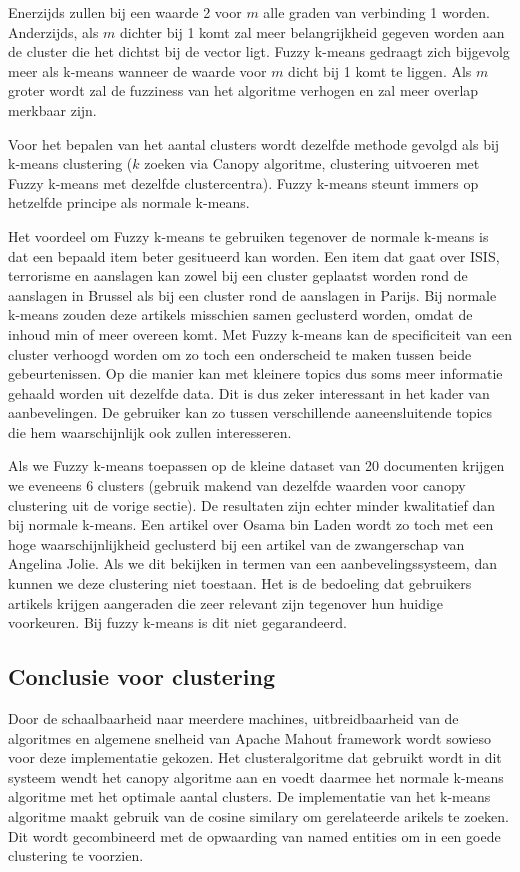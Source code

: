 Enerzijds zullen bij een waarde 2 voor $m$ alle graden van verbinding 1 worden. Anderzijds, als $m$ dichter bij 1 komt zal meer belangrijkheid gegeven worden aan de cluster die het dichtst bij de vector ligt. Fuzzy k-means gedraagt zich bijgevolg meer als k-means wanneer de waarde voor $m$ dicht bij 1 komt te liggen. Als $m$ groter wordt zal de fuzziness van het algoritme verhogen en zal meer overlap merkbaar zijn. 

Voor het bepalen van het aantal clusters wordt dezelfde methode gevolgd als bij k-means clustering ($k$ zoeken via Canopy algoritme, clustering uitvoeren met Fuzzy k-means met dezelfde clustercentra). Fuzzy k-means steunt immers op hetzelfde principe als normale k-means. 

Het voordeel om Fuzzy k-means te gebruiken tegenover de normale k-means is dat een bepaald item beter gesitueerd kan worden. Een item dat gaat over ISIS, terrorisme en aanslagen kan zowel bij een cluster geplaatst worden rond de aanslagen in Brussel als bij een cluster rond de aanslagen in Parijs. Bij normale k-means zouden deze artikels misschien samen geclusterd worden, omdat de inhoud min of meer overeen komt. Met Fuzzy k-means kan de specificiteit van een cluster verhoogd worden om zo toch een onderscheid te maken tussen beide gebeurtenissen. Op die manier kan met kleinere topics dus soms meer informatie gehaald worden uit dezelfde data. Dit is dus zeker interessant in het kader van aanbevelingen. De gebruiker kan zo tussen verschillende aaneensluitende topics  die hem waarschijnlijk ook zullen interesseren. 

Als we Fuzzy k-means toepassen op de kleine dataset van 20 documenten krijgen we eveneens 6 clusters (gebruik makend van dezelfde waarden voor canopy clustering uit de vorige sectie). De resultaten zijn echter minder kwalitatief dan bij normale k-means. Een artikel over Osama bin Laden wordt zo toch met een hoge waarschijnlijkheid geclusterd bij een artikel van de zwangerschap van Angelina Jolie. Als we dit bekijken in termen van een aanbevelingssysteem, dan kunnen we deze clustering niet toestaan. Het is de bedoeling dat gebruikers artikels krijgen aangeraden die zeer relevant zijn tegenover hun huidige voorkeuren. Bij fuzzy k-means is dit niet gegarandeerd. 

\subsection{Conclusie voor clustering}
Door de schaalbaarheid naar meerdere machines, uitbreidbaarheid van de algoritmes en algemene snelheid van Apache Mahout framework wordt sowieso voor deze implementatie gekozen. Het clusteralgoritme dat gebruikt wordt in dit systeem wendt het canopy algoritme aan en voedt daarmee het normale k-means algoritme met het optimale aantal clusters. De implementatie van het k-means algoritme maakt gebruik van de cosine similary om gerelateerde arikels te zoeken. Dit wordt gecombineerd met de opwaarding van named entities om in een goede clustering te voorzien.


